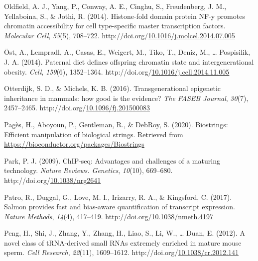 \documentclass[12pt,twoside]{reedthesis}
\newlength{\cslhangindent}
\newenvironment{CSLReferences}[2] %
 {%
  \setlength{\parindent}{0pt}
  \ifodd #1 \everypar{\setlength{\hangindent}{\cslhangindent}}\ignorespaces\fi
  \ifnum #2 > 0
  \setlength{\parskip}{#2\baselineskip}
  \fi
 }%
 {}
\begin{document}
\begin{CSLReferences}{1}{0}
\leavevmode{}%
Oldfield, A. J., Yang, P., Conway, A. E., Cinghu, S., Freudenberg, J. M., Yellaboina, S., \& Jothi, R. (2014). Histone-fold domain protein NF-y promotes chromatin accessibility for cell type-specific master transcription factors. \emph{Molecular Cell}, \emph{55}(5), 708--722. http://doi.org/\href{https://doi.org/10.1016/j.molcel.2014.07.005}{10.1016/j.molcel.2014.07.005}

\leavevmode{}%
Öst, A., Lempradl, A., Casas, E., Weigert, M., Tiko, T., Deniz, M., \ldots{} Pospisilik, J. A. (2014). Paternal diet defines offspring chromatin state and intergenerational obesity. \emph{Cell}, \emph{159}(6), 1352--1364. http://doi.org/\href{https://doi.org/10.1016/j.cell.2014.11.005}{10.1016/j.cell.2014.11.005}

\leavevmode{}%
Otterdijk, S. D., \& Michels, K. B. (2016). Transgenerational epigenetic inheritance in mammals: how good is the evidence? \emph{The FASEB Journal}, \emph{30}(7), 2457--2465. http://doi.org/\href{https://doi.org/10.1096/fj.201500083}{10.1096/fj.201500083}

\leavevmode{}%
Pagès, H., Aboyoun, P., Gentleman, R., \& DebRoy, S. (2020). Biostrings: Efficient manipulation of biological strings. Retrieved from \url{https://bioconductor.org/packages/Biostrings}

\leavevmode{}%
Park, P. J. (2009). ChIP-seq: Advantages and challenges of a maturing technology. \emph{Nature Reviews. Genetics}, \emph{10}(10), 669--680. http://doi.org/\href{https://doi.org/10.1038/nrg2641}{10.1038/nrg2641}

\leavevmode{}%
Patro, R., Duggal, G., Love, M. I., Irizarry, R. A., \& Kingsford, C. (2017). Salmon provides fast and bias-aware quantification of transcript expression. \emph{Nature Methods}, \emph{14}(4), 417--419. http://doi.org/\href{https://doi.org/10.1038/nmeth.4197}{10.1038/nmeth.4197}

\leavevmode{}%
Peng, H., Shi, J., Zhang, Y., Zhang, H., Liao, S., Li, W., \ldots{} Duan, E. (2012). A novel class of tRNA-derived small RNAs extremely enriched in mature mouse sperm. \emph{Cell Research}, \emph{22}(11), 1609--1612. http://doi.org/\href{https://doi.org/10.1038/cr.2012.141}{10.1038/cr.2012.141}


\end{CSLReferences}
\end{document}
